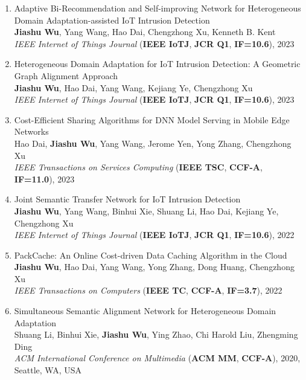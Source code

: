 \documentclass[letterpaper,10.9pt]{article}
\begin{document}
\begin{enumerate}
  \item Adaptive Bi-Recommendation and Self-improving Network for Heterogeneous Domain Adaptation-assisted IoT Intrusion Detection\\
  \textbf{Jiashu Wu}, Yang Wang\textsuperscript{\Letter}, Hao Dai, Chengzhong Xu, Kenneth B. Kent\\
  \textit{IEEE Internet of Things Journal} (\textbf{IEEE IoTJ}, \textbf{JCR Q1}, \textbf{IF=10.6}), 2023

  \item Heterogeneous Domain Adaptation for IoT Intrusion Detection: A Geometric Graph Alignment Approach\\
  \textbf{Jiashu Wu}, Hao Dai, Yang Wang\textsuperscript{\Letter}, Kejiang Ye, Chengzhong Xu\\
  \textit{IEEE Internet of Things Journal} (\textbf{IEEE IoTJ}, \textbf{JCR Q1}, \textbf{IF=10.6}), 2023

  \item Cost-Efficient Sharing Algorithms for DNN Model Serving in Mobile Edge Networks\\
  Hao Dai, \textbf{Jiashu Wu}, Yang Wang\textsuperscript{\Letter}, Jerome Yen, Yong Zhang, Chengzhong Xu\\
  \textit{IEEE Transactions on Services Computing} (\textbf{IEEE TSC}, \textbf{CCF-A}, \textbf{IF=11.0}), 2023

  \item Joint Semantic Transfer Network for IoT Intrusion Detection\\
  \textbf{Jiashu Wu}, Yang Wang\textsuperscript{\Letter}, Binhui Xie, Shuang Li, Hao Dai, Kejiang Ye, Chengzhong Xu\\
  \textit{IEEE Internet of Things Journal} (\textbf{IEEE IoTJ}, \textbf{JCR Q1}, \textbf{IF=10.6}), 2022

  \item PackCache: An Online Cost-driven Data Caching Algorithm in the Cloud\\
  \textbf{Jiashu Wu}, Hao Dai, Yang Wang\textsuperscript{\Letter}, Yong Zhang, Dong Huang, Chengzhong Xu\\
  \textit{IEEE Transactions on Computers} (\textbf{IEEE TC}, \textbf{CCF-A}, \textbf{IF=3.7}), 2022

  \item Simultaneous Semantic Alignment Network for Heterogeneous Domain Adaptation\\
  Shuang Li, Binhui Xie, \textbf{Jiashu Wu}, Ying Zhao, Chi Harold Liu\textsuperscript{\Letter}, Zhengming Ding\\
  \textit{ACM International Conference on Multimedia} (\textbf{ACM MM}, \textbf{CCF-A}), 2020, Seattle, WA, USA


\end{enumerate}
\end{document}
